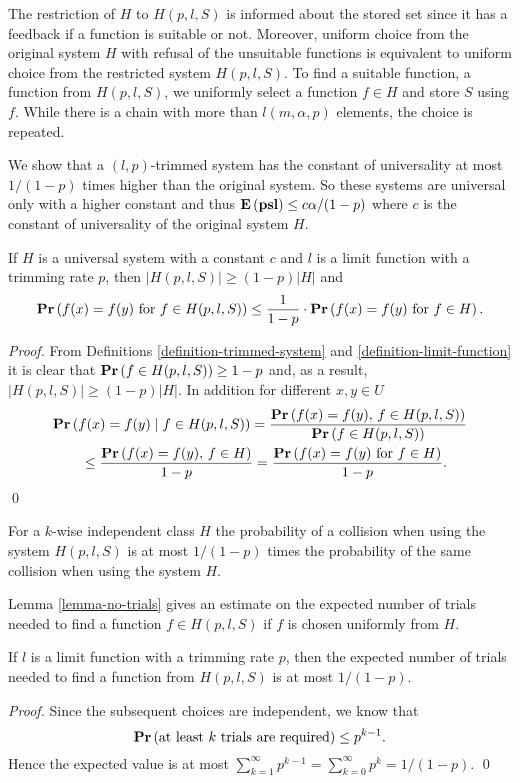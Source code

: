 The restriction of $H$ to $H(p, l, S)$ is informed about the stored set since it has a feedback if a function is suitable or not. Moreover, uniform choice from the original system $H$ with refusal of the unsuitable functions is equivalent to uniform choice from the restricted system $H(p, l, S)$. To find a suitable function, a function from $H(p, l, S)$, we uniformly select a function $f \in H$ and store $S$ using $f$. While there is a chain with more than $l(m, \alpha, p)$ elements, the choice is repeated.

We show that a $(l, p)$-trimmed system has the constant of universality at most $1 / (1 - p)$ times higher than the original system. So these systems are universal only with a higher constant and thus $\mathbf{E}\left(\mathbf{psl}\right) \leq c\alpha/(1-p)$ where $c$ is the constant of universality of the original system $H$.

\begin{lemma}
\label{lemma-trimmed-system}
If $H$ is a universal system with a constant $c$ and $l$ is a limit function with a trimming rate $p$, then $|H(p, l, S)| \geq (1 - p)|H|$ and  \[ \mathbf{Pr}\left(f(x) = f(y) \mbox{ for } f \in H(p, l, S)\right) \leq \frac{1}{1 - p} \cdot \mathbf{Pr}\left(f(x) = f(y) \mbox{ for } f \in H\right). \]
\end{lemma}
\begin{proof}
From Definitions \ref{definition-trimmed-system} and \ref{definition-limit-function} it is clear that $\mathbf{Pr}\left(f \in H(p, l, S)\right) \geq 1 - p$ and, as a result, $|H(p, l, S)| \geq (1 - p)|H|$. In addition for different $x, y \in U$ 
\[
\begin{split}
& \mathbf{Pr}\left(f(x) = f(y) \mid f \in H(p, l, S)\right) 
	= \frac{\mathbf{Pr}\left(f(x) = f(y),\, f \in H(p, l, S)\right)}{\mathbf{Pr}\left(f \in H(p, l, S)\right)} \\
	& \qquad \leq \frac{\mathbf{Pr}\left(f(x) = f(y),\, f \in H\right)}{1 - p} = \frac{\mathbf{Pr}\left(f(x) = f(y) \mbox{ for } f \in H\right)}{1 - p}. \\
\end{split}
\]
\qed
\end{proof}

For a $k$-wise independent class $H$ the probability of a collision when using the system $H(p, l, S)$ is at most $1 / (1 - p)$ times the probability of the same collision when using the system $H$.

Lemma \ref{lemma-no-trials} gives an estimate on the expected number of trials needed to find a function $f \in H(p, l, S)$ if $f$ is chosen uniformly from $H$.

\begin{lemma}
\label{lemma-no-trials}
If $l$ is a limit function with a trimming rate $p$, then the expected number of trials needed to find a function from $H(p, l, S)$ is at most ${1}/{(1 - p)}$.
\end{lemma}
\begin{proof}
Since the subsequent choices are independent, we know that \[\mathbf{Pr}\left(\mbox{at least }k\mbox{ trials are required}\right) \leq p^{k - 1}.\]
Hence the expected value is at most $\sum_{k = 1}^{\infty} p^{k - 1} = \sum_{k = 0}^{\infty} p^k = {1}/{(1 - p)}.$
\qed
\end{proof}

